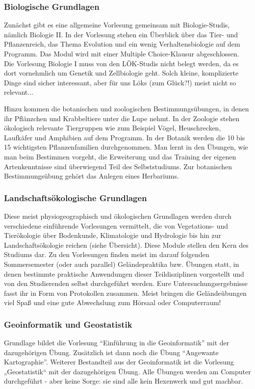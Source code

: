 \subsubsection{Biologische Grundlagen}
Zunächst gibt es eine allgemeine Vorlesung gemeinsam mit Biologie-Studis, nämlich Biologie II. In der Vorlesung stehen ein Überblick über das Tier- und Pflanzenreich, das Thema Evolution und ein wenig Verhaltensbiologie auf dem Programm. Das Modul wird mit einer Multiple Choice-Klausur abgeschlossen. Die Vorlesung Biologie I muss von den LÖK-Studis nicht belegt werden, da es dort vornehmlich um Genetik und Zellbiologie geht. Solch kleine, komplizierte Dinge sind sicher interessant, aber für uns Löks (zum Glück?!) meist nicht so relevant...

Hinzu kommen die botanischen und zoologischen Bestimmungsübungen, in denen ihr Pflänzchen und Krabbeltiere unter die Lupe nehmt. In der Zoologie stehen ökologisch relevante Tiergruppen wie zum Beispiel Vögel, Heuschrecken, Laufkäfer und Amphibien auf dem Programm. In der Botanik werden die 10 bis 15 wichtigsten Pflanzenfamilien durchgenommen. Man lernt in den Übungen, wie man beim Bestimmen vorgeht, die Erweiterung und das Training der eigenen Artenkenntnisse sind überwiegend Teil des Selbststudiums. Zur botanischen Bestimmungsübung gehört das Anlegen eines Herbariums.

\subsubsection*{Landschaftsökologische Grundlagen}
Diese meist physiogeographisch und ökologischen Grundlagen werden durch verschiedene einführende Vorlesungen vermittelt, die von Vegetations- und Tierökologie über Bodenkunde, Klimatologie und Hydrologie bis hin zur Landschaftsökologie reichen (siehe Übersicht). Diese Module stellen den Kern des Studiums dar. Zu den Vorlesungen ﬁnden meist im darauf folgenden Sommersemester (oder auch parallel) Geländepraktika bzw. Übungen statt, in denen bestimmte praktische Anwendungen dieser Teildisziplinen vorgestellt und von den Studierenden selbst durchgeführt werden. Eure Untersuchungsergebnisse fasst ihr in Form von Protokollen zusammen. Meist bringen die Geländeübungen viel Spaß und eine gute Abwechslung zum Hörsaal oder Computerraum!

\subsubsection*{Geoinformatik und Geostatistik}
Grundlage bildet die Vorlesung \enquote{Einführung in die Geoinformatik} mit der dazugehörigen Übung. Zusätzlich ist dann noch die Übung \enquote{Angewante Kartographie}. Weiterer Bestandteil aus der Geoinformatik ist die Vorlesung „Geostatistik“ mit der dazugehörigen Übung. Alle Übungen werden am Computer durchgeführt - aber keine Sorge: sie sind alle kein Hexenwerk und gut machbar.

